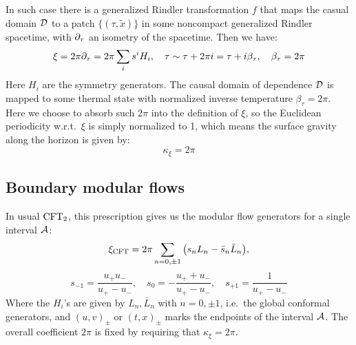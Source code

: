 \documentclass[11pt,a4paper]{article}
\begin{document}
	In such case there is a generalized Rindler transformation $f$ that maps the casual domain $\mathcal{D}$ to a patch $\{(\tau,\tilde{x})\}$ in some noncompact generalized Rindler spacetime, with $\partial_{\tau}$ an isometry of the spacetime. Then we have:
	\begin{equation}
		\xi = 2\pi \partial_{\tau}
		= 2\pi \sum_i s^i H_i,
	\quad
		\tau \sim \tau + 2\pi i
		= \tau + i\beta_\tau,
	\quad
		\beta_\tau = 2\pi
	\end{equation}
	Here $H_i$ are the symmetry generators. The causal domain of dependence $\mathcal{D}$ is mapped to some thermal state with normalized inverse temperature $\beta_\tau = 2\pi$. Here we choose to absorb such $2\pi$ into the definition of $\xi$, so the Euclidean periodicity w.r.t.~$\xi$ is simply normalized to 1, which means the surface gravity along the horizon is given by:
	\begin{equation}
		\kappa_\xi = 2\pi
	\end{equation}
\subsection{Boundary modular flows}
	In usual $\mathrm{CFT}_2$, this prescription gives us the modular flow generators for a single interval $\mathcal{A}$:
	\begin{equation}
		\xi_\mrm{CFT} = 2\pi \sum_{n=0,\pm 1} \pqty{
				s_n L_n - \bar{s}_n \bar{L}_n
			},
	\end{equation}
	\begin{equation}
		s_{-1} = \frac{u_+ u_-}{u_+ - u_-},\quad
		s_0 = - \frac{u_+ + u_-}{u_+ - u_-},\quad
		s_{+1} = \frac{1}{u_+ - u_-}
	\end{equation}
	Where the $H_i$'s are given by $L_n,\bar{L}_n$ with $n=0,\pm 1$, i.e.~the global conformal generators, and $(u,v)_\pm$ or $(t,x)_\pm$ marks the endpoints of the interval $\mathcal{A}$. The overall coefficient $2\pi$ is fixed by requiring that $\kappa_\xi = 2\pi$. 
	
\end{document}
